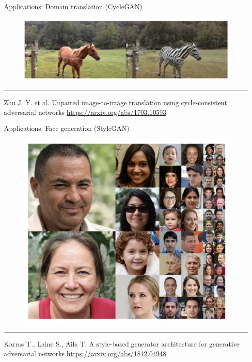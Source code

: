 \documentclass{beamer}
\begin{document}
\begin{frame}{Applications: Domain translation (CycleGAN)}
    \begin{figure}
        \centering
        \includegraphics[width=1.0\linewidth]{figs/cyclegan.png}
        \label{fig:cyclegan}
    \end{figure}
\vfill
\hrule\medskip
{\scriptsize Zhu J. Y. et al. Unpaired image-to-image translation using cycle-consistent adversarial networks  \href{https://arxiv.org/abs/1703.10593}{https://arxiv.org/abs/1703.10593}}
\end{frame}
\begin{frame}{Applications: Face generation (StyleGAN)}
    \begin{figure}
        \centering
        \includegraphics[width=0.65\linewidth]{figs/stylegan.png}
        \label{fig:stylegan}
    \end{figure}
\vfill
\hrule\medskip
{\scriptsize Karras T., Laine S., Aila T. A style-based generator architecture for generative adversarial networks  \href{https://arxiv.org/abs/1812.04948}{https://arxiv.org/abs/1812.04948}}
\end{frame}
\end{document}

